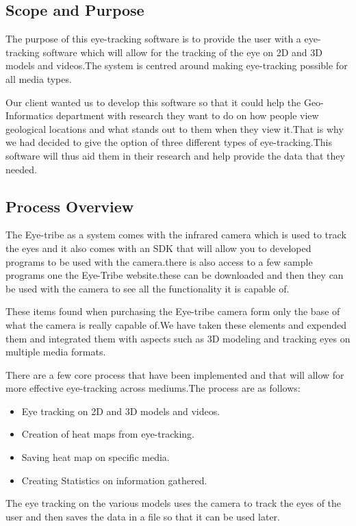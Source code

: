 \subsection{Scope and Purpose}
The purpose of this eye-tracking software is to provide the user with a eye-tracking software which will allow for the tracking of the eye on 2D and 3D models and videos.The system is centred around making eye-tracking possible for all media types.

Our client wanted us to develop this software so that it could help the Geo-Informatics department with research they want to do on how people view geological locations and what stands out to them when they view it.That is why we had decided to give the option of three different types of eye-tracking.This software will thus aid them in their research and help provide the data that they needed.

\subsection{Process Overview }
The Eye-tribe as a system comes with the infrared camera which is used to track the eyes and it also comes with an SDK that will allow you to developed programs to be used with the camera.there is also access to a few sample programs one the Eye-Tribe website.these can be downloaded and then they can be used with the camera to see all the functionality it is capable of.

These items found when purchasing the Eye-tribe camera form only the base of what the camera is really capable of.We have taken these elements and expended them and integrated them with aspects such as 3D modeling and tracking eyes on multiple media formats.

There are a few core process that have been implemented and that will allow for more effective eye-tracking across mediums.The process are as follows:
\begin{itemize}
\item Eye tracking on 2D and 3D models and videos.
\item Creation of heat maps from eye-tracking.
\item Saving heat map on specific media.
\item Creating Statistics on information gathered.
\end{itemize}

The eye tracking on the various models uses the camera to track the eyes of the user and then saves the data in a file so that it can be used later.

